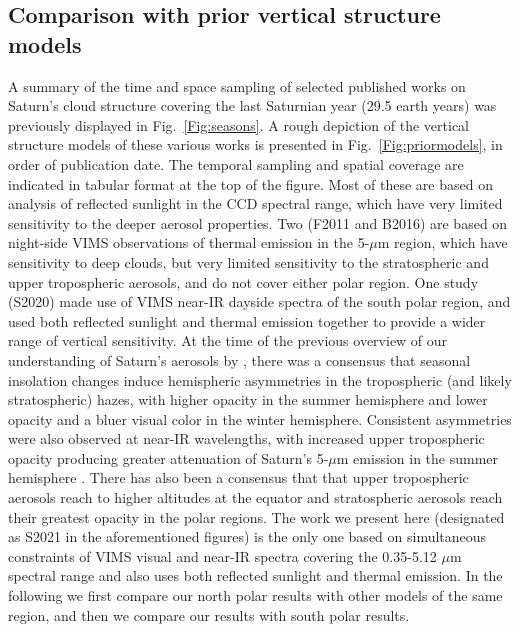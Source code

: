 \documentclass[article,11pt]{emulateapj}
\def\mum{$\mu$m }
\begin{document}
\subsection{Comparison with prior vertical structure models}

A summary of the time and space sampling of selected published works
on Saturn's cloud structure covering the last Saturnian year (29.5
earth years) was previously displayed in Fig.\ \ref{Fig:seasons}.  A
rough depiction of the vertical structure models of these various
works is presented in Fig.\ \ref{Fig:priormodels}, in order of
publication date.  The temporal sampling and spatial coverage are
indicated in tabular format at the top of the figure.  Most of these
are based on analysis of reflected sunlight in the CCD spectral range,
which have very limited sensitivity to the deeper aerosol properties.
Two (F2011 and B2016) are based on night-side VIMS observations of
thermal emission in the 5-\mum region, which have sensitivity to deep
clouds, but very limited sensitivity to the stratospheric and upper
tropospheric aerosols, and do not cover either polar region.  One
study (S2020) made use of VIMS near-IR dayside spectra of the south
polar region, and used both reflected sunlight and thermal emission
together to provide a wider range of vertical sensitivity.  At the
time of the previous overview of our understanding of Saturn's
aerosols by \cite{Fletcher2019book}, there was a consensus that
seasonal insolation changes induce hemispheric asymmetries in the
tropospheric (and likely stratospheric) hazes, with higher opacity in
the summer hemisphere and lower opacity and a bluer visual color in
the winter hemisphere.  Consistent asymmetries were also observed at
near-IR wavelengths, with increased upper tropospheric opacity
producing greater attenuation of Saturn's 5-\mum emission in the
summer hemisphere \citep{Baines2006DPS,Fletcher2011vims}.  There has
also been a consensus that that upper tropospheric aerosols reach to
higher altitudes at the equator and stratospheric aerosols reach their
greatest opacity in the polar regions.  The work we present here
(designated as S2021 in the aforementioned figures) is the only one
based on simultaneous constraints of VIMS visual and near-IR spectra
covering the 0.35-5.12 \mum spectral range and also uses both
reflected sunlight and thermal emission. In the following we first compare
our north polar results with other  models of the same region,
and then we compare our results with south polar results.
\end{document}
